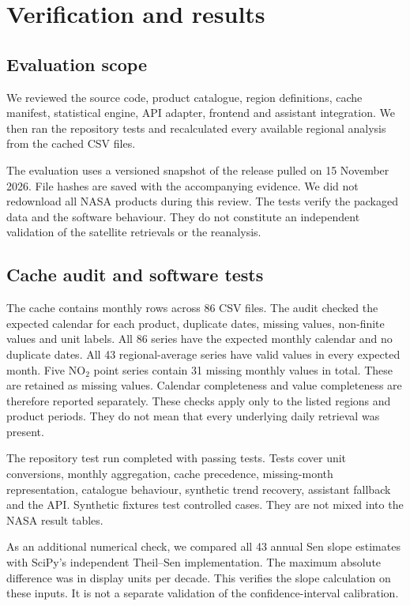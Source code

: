 \documentclass[10pt,a4paper,twocolumn]{article}
\begin{document}
\section{Verification and results}
\subsection{Evaluation scope}
We reviewed the source code, product catalogue, region definitions, cache manifest, statistical engine, API adapter, frontend and assistant integration. We then ran the repository tests and recalculated every available regional analysis from the cached CSV files.

The evaluation uses a versioned snapshot of the release pulled on 15 November 2026. File hashes are saved with the accompanying evidence. We did not redownload all NASA products during this review. The tests verify the packaged data and the software behaviour. They do not constitute an independent validation of the satellite retrievals or the reanalysis.

\subsection{Cache audit and software tests}
The cache contains \TotalCacheValues{} monthly rows across 86 CSV files. The audit checked the expected calendar for each product, duplicate dates, missing values, non-finite values and unit labels. All 86 series have the expected monthly calendar and no duplicate dates. All 43 regional-average series have valid values in every expected month. Five NO$_2$ point series contain 31 missing monthly values in total. These are retained as missing values. Calendar completeness and value completeness are therefore reported separately. These checks apply only to the listed regions and product periods. They do not mean that every underlying daily retrieval was present.

The repository test run completed with \TestCount{} passing tests. Tests cover unit conversions, monthly aggregation, cache precedence, missing-month representation, catalogue behaviour, synthetic trend recovery, assistant fallback and the API. Synthetic fixtures test controlled cases. They are not mixed into the NASA result tables.

As an additional numerical check, we compared all 43 annual Sen slope estimates with SciPy's independent Theil--Sen implementation. The maximum absolute difference was \SenError{} in display units per decade. This verifies the slope calculation on these inputs. It is not a separate validation of the confidence-interval calibration.
\end{document}

